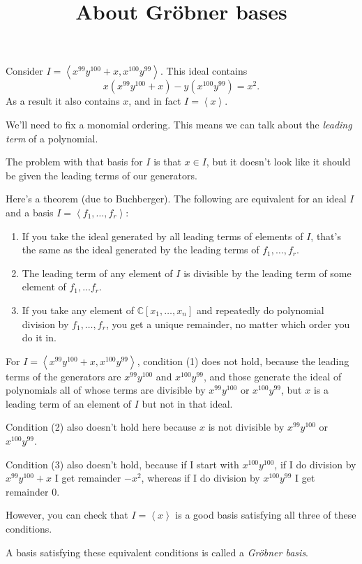 \documentclass[a4paper, 14pt]{extarticle}
\title{About Gr\"obner bases}
\newcommand{\bC}{\mathbb{C}}
\begin{document}
\maketitle

Consider $I = \left<x^{99}y^{100}+x, x^{100}y^{99}\right>$. This ideal contains
\[x(x^{99}y^{100}+x) - y(x^{100}y^{99}) = x^2.\]
As a result it also contains $x$, and in fact $I = \left<x\right>$.

We'll need to fix a monomial ordering. This means we can talk about
the \emph{leading term} of a polynomial.

The problem with that basis for $I$ is that $x\in I$, but it doesn't
look like it should be given the leading terms of our generators.

Here's a theorem (due to Buchberger). The following are equivalent for
an ideal $I$ and a basis $I=\left<f_1,\ldots,f_r\right>$:
\begin{enumerate}
\item If you take the ideal generated by all leading terms of elements
  of $I$, that's the same as the ideal generated by the leading terms
  of $f_1, \ldots, f_r$.
\item The leading term of any element of $I$ is divisible by the
  leading term of some element of $f_1,\ldots f_r$.
\item If you take any element of $\bC[x_1,\ldots,x_n]$ and repeatedly
  do polynomial division by $f_1,\ldots,f_r$, you get a unique remainder,
  no matter which order you do it in.
\end{enumerate}

For $I=\left<x^{99}y^{100}+x, x^{100}y^{99}\right>$, condition (1)
does not hold, because the leading terms of the generators are
$x^{99}y^{100}$ and $x^{100}y^{99}$, and those generate the ideal of
polynomials all of whose terms are divisible by $x^{99}y^{100}$ or
$x^{100}y^{99}$, but $x$ is a leading term of an element of $I$ but
not in that ideal.

Condition (2) also doesn't hold here because $x$ is not divisible by
$x^{99}y^{100}$ or $x^{100}y^{99}$.

Condition (3) also doesn't hold, because if I start with
$x^{100}y^{100}$, if I do division by $x^{99}y^{100}+x$ I get
remainder $-x^2$, whereas if I do division by $x^{100}y^{99}$ I get
remainder $0$.

However, you can check that $I=\left<x\right>$ is a good basis
satisfying all three of these conditions.

A basis satisfying these equivalent conditions is called a
\emph{Gr\"obner basis}.
\end{document}
